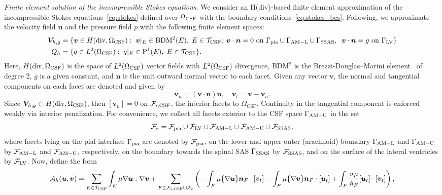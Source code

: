 \documentclass[fleqn,10pt]{wlscirep}
\begin{document}
\textit{Finite element solution of the incompressible Stokes equations}.
We consider an H(div)-based finite element approximation of the incompressible Stokes equations~\eqref{eq:stokes} defined over $\Omega_{\rm CSF}$ with the boundary conditions~\eqref{eq:stokes_bcs}. Following\cite{hong2016robust}, we approximate the velocity field $\bm u$ and the pressure field $p$ with the following finite element spaces:
\begin{align*}
  \bm V_{h,g} &= \{ \bm v  \in H(\mathrm{div}, \Omega_{\mathrm{CSF}}): \;
  \bm v \vert_{E} \in \mathrm{BDM}^2(E), \; E \in \mathcal{T}_{\rm CSF}; \;
  \bm v \cdot \bm n = 0
  \text{ on } \Gamma_{\rm{pia}} \cup \Gamma_{\rm AM-L} \cup \Gamma_{\rm{SSAS}}, \;\; \bm v \cdot \bm n =  g %
  \text{ on } \Gamma_{\mathrm{LV}} \}  \\ 
  Q_h  &= \{q \in L^2(\Omega_{\rm CSF}): \; q \vert_E \in \mathrm{P}^1(E),
  \; E \in \mathcal{T}_{\rm CSF} \}. 
\end{align*}
Here, $H(\mathrm{div}, \Omega_{\rm{CSF}})$ is the space of $L^2(\Omega_{\rm{CSF}})$ vector fields with $L^2(\Omega_{\rm{CSF}})$ divergence, $\mathrm{BDM}^2$ is the Brezzi-Douglas--Marini element~\cite{brezzi1987mixed} of degree 2, $g$ is a given constant, and $\bm n$ is the unit outward normal vector to each facet. Given any vector $\bm v$, the normal and tangential components on each facet are denoted and given by 
$$ \bm v_n = (\bm v \cdot \bm n) \bm n, \quad \bm v_t = \bm v - \bm v_n. 
$$ 
Since $\bm V_{h,g} \subset H(\mathrm{div}, \Omega_{\rm CSF})$, then $[\bm
  v_n] = 0 $ on $\mathcal{F}_{i, \rm CSF}$, the interior facets to $\Omega_{\mathrm{CSF}}$. Continuity in the
tangential component is enforced weakly via interior penalization. For
convenience, we collect all facets exterior to the CSF space  $\Gamma_{\rm AM-U}$ in the set
$$\mathcal{F}_{e} = \mathcal{F}_{\rm pia} \cup \mathcal{F}_{\rm LV}
\cup \mathcal{F}_{\rm AM-L}\cup \mathcal{F}_{\rm AM-U}  \cup \mathcal{F}_{\rm SSAS}, $$ 
where facets
lying on the pial interface $\Gamma_{\rm pia}$ are denoted by
$\mathcal{F}_{\rm pia}$, on the lower and upper outer (arachnoid) boundary
$\Gamma_{\rm AM-L}$ and $\Gamma_{\rm AM-U}$ by $\mathcal{F}_{\rm AM-L}$ and $\mathcal{F}_{\rm AM-U}$, respectively, 
 on the boundary towards the spinal SAS $\Gamma_{\rm SSAS}$ by
$\mathcal{F}_{\rm SSAS}$, and on the surface of the lateral ventricles by $\mathcal{F}_{\rm LV}$. Now, define the form 
\begin{multline}
  \mathcal{A}_h(\bm u, \bm v)
  = \sum_{E \in \mathcal{T}_{\rm CSF}} \int_{E} \mu \nabla \bm u : \nabla \bm v
 + \sum_{F \in \mathcal{F}_{i, \rm CSF} \cup \mathcal{F}_{e}} \left (
  -\int_{F} \mu \{\nabla \bm u\}  \bm n_F \cdot [\bm v_t] 
  - %
  \int_{F} \mu \{\nabla \bm v\}  \bm n_F \cdot [\bm u_t]
  + %
\int_{F}   \frac{\sigma \mu}{h_F} [\bm u_t ] \cdot [\bm v_t] \right ),   
\end{multline}
\end{document}
